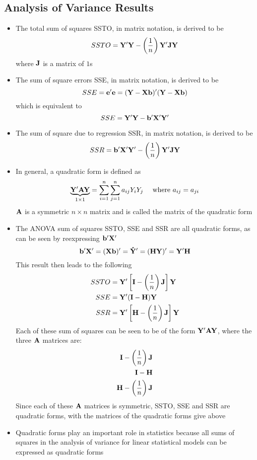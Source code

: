 \subsection{Analysis of Variance Results} 
\begin{itemize}
\item The total sum of squares SSTO, in matrix notation, is derived to be $$ SSTO = \mathbf{Y}'\mathbf{Y} - \left(\frac{1}{n}\right)\mathbf{Y}'\mathbf{J}\mathbf{Y} $$ where $\mathbf{J}$ is a matrix of $1$s 
\item The sum of square errors SSE, in matrix notation, is derived to be $$ SSE = \mathbf{e}'\mathbf{e} = (\mathbf{Y}-\mathbf{Xb})'(\mathbf{Y} - \mathbf{Xb}) $$ which is equivalent to $$ SSE = \mathbf{Y}'\mathbf{Y} - \mathbf{b}'\mathbf{X}'\mathbf{Y}' $$ 
\item The sum of square due to regression SSR, in matrix notation, is derived to be $$ SSR = \mathbf{b}'\mathbf{X}'\mathbf{Y}' - \left(\frac{1}{n}\right)\mathbf{Y}'\mathbf{J}\mathbf{Y} $$ 
\item In general, a quadratic form is defined as $$ \underbrace{\mathbf{Y}'\mathbf{AY}}_{1 \times 1} = \sum_{i=1}^n \sum_{j=1}^n a_{ij}Y_iY_j ~~~~ \text{where } a_{ij} = a_{ji} $$  
$\mathbf{A}$ is a symmetric $n \times n$ matrix and is called the matrix of the quadratic form
\item The ANOVA sum of squares SSTO, SSE and SSR are all quadratic forms, as can be seen by reexpressing $\mathbf{b}'\mathbf{X}'$
$$ \mathbf{b}'\mathbf{X}' = (\mathbf{Xb})'  = \mathbf{\hat{Y}}' = (\mathbf{HY})' = \mathbf{Y}'\mathbf{H} $$ 
This result then leads to the following $$ \begin{aligned} SSTO &= \mathbf{Y}'\left[\mathbf{I} - \left(\frac{1}{n}\right)\mathbf{J}\right]\mathbf{Y} \\ SSE &= \mathbf{Y}'(\mathbf{I} - \mathbf{H})\mathbf{Y} \\ SSR &= \mathbf{Y}'\left[\mathbf{H} - \left(\frac{1}{n}\right) \mathbf{J}\right] \mathbf{Y} \end{aligned} $$ 
Each of these sum of squares can be seen to be of the form $\mathbf{Y}'\mathbf{AY}$, where the three $\mathbf{A}$ matrices are: $$ \begin{aligned} \mathbf{I} - \left(\frac{1}{n}\right)\mathbf{J} \\ \mathbf{I} - \mathbf{H} \\ \mathbf{H} - \left(\frac{1}{n}\right) \mathbf{J} \end{aligned} $$ 
Since each of these $\mathbf{A}$ matrices is symmetric, SSTO, SSE and SSR are quadratic forms, with the matrices of the quadratic forms give above
\item Quadratic forms play an important role in statistics because all sums of squares in the analysis of variance for linear statistical models can be expressed as quadratic forms 
\end{itemize} 

